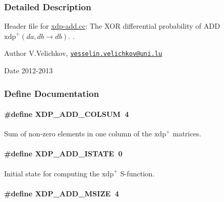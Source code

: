 \subsubsection{\-Detailed \-Description}
\-Header file for \hyperlink{xdp-add_8cc}{xdp-\/add.\-cc}\-: \-The \-X\-O\-R differential probability of \-A\-D\-D $\mathrm{xdp}^{+}(da,db \rightarrow db)$. . \begin{DoxyAuthor}{\-Author}
\-V.\-Velichkov, \href{mailto:vesselin.velichkov@uni.lu}{\tt vesselin.\-velichkov@uni.\-lu} 
\end{DoxyAuthor}
\begin{DoxyDate}{\-Date}
2012-\/2013 
\end{DoxyDate}


\subsubsection{\-Define \-Documentation}
\hypertarget{xdp-add_8hh_aeb8ed0e44f09ad721abf655bae8e986a}{
\paragraph[{\-X\-D\-P\-\_\-\-A\-D\-D\-\_\-\-C\-O\-L\-S\-U\-M}]{\setlength{\rightskip}{0pt plus 5cm}\#define {\bf \-X\-D\-P\-\_\-\-A\-D\-D\-\_\-\-C\-O\-L\-S\-U\-M}~4}}\label{xdp-add_8hh_aeb8ed0e44f09ad721abf655bae8e986a}
\-Sum of non-\/zero elements in one column of the $\mathrm{xdp}^{+}$ matrices. \hypertarget{xdp-add_8hh_a568bedde4a45fb1cb5591549f90303e1}{
\paragraph[{\-X\-D\-P\-\_\-\-A\-D\-D\-\_\-\-I\-S\-T\-A\-T\-E}]{\setlength{\rightskip}{0pt plus 5cm}\#define {\bf \-X\-D\-P\-\_\-\-A\-D\-D\-\_\-\-I\-S\-T\-A\-T\-E}~0}}\label{xdp-add_8hh_a568bedde4a45fb1cb5591549f90303e1}
\-Initial state for computing the $\mathrm{xdp}^{+}$ \-S-\/function. \hypertarget{xdp-add_8hh_ab4682e30389129be27b47c6ad0f7ecee}{
\paragraph[{\-X\-D\-P\-\_\-\-A\-D\-D\-\_\-\-M\-S\-I\-Z\-E}]{\setlength{\rightskip}{0pt plus 5cm}\#define {\bf \-X\-D\-P\-\_\-\-A\-D\-D\-\_\-\-M\-S\-I\-Z\-E}~4}}\label{xdp-add_8hh_ab4682e30389129be27b47c6ad0f7ecee}

